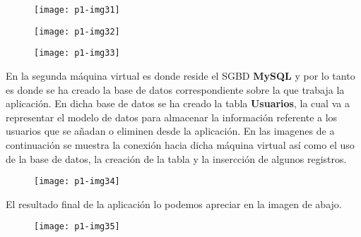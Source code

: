 \documentclass[10pt]{article}
\begin{document}
 \begin{figure}[H]
	\begin{center}
 		\texttt{[image: p1-img31]}
	\end{center} 
\end{figure}

 \begin{figure}[H]
	\begin{center}
 		\texttt{[image: p1-img32]}
	\end{center} 
\end{figure}

 \begin{figure}[H]
	\begin{center}
 		\texttt{[image: p1-img33]}
	\end{center} 
\end{figure}

En la segunda máquina virtual es donde reside el SGBD \textbf{MySQL} y por lo tanto es donde se ha creado la base de datos correspondiente sobre la que trabaja la aplicación. En dicha base de datos se ha creado la tabla \textbf{Usuarios}, la cual va a representar el modelo de datos para almacenar la información referente a los usuarios que se añadan o eliminen desde la aplicación. En las imagenes de a continuación se muestra la conexión hacia dicha máquina virtual así como el uso de la base de datos, la creación de la tabla y la insercción de algunos registros.\\


 \begin{figure}[H]
	\begin{center}
 		\texttt{[image: p1-img34]}
	\end{center} 
\end{figure} 


El resultado final de la aplicación lo podemos apreciar en la imagen de abajo.\\

 \begin{figure}[H]
	\begin{center}
 		\texttt{[image: p1-img35]}
	\end{center} 
\end{figure}
\end{document}
